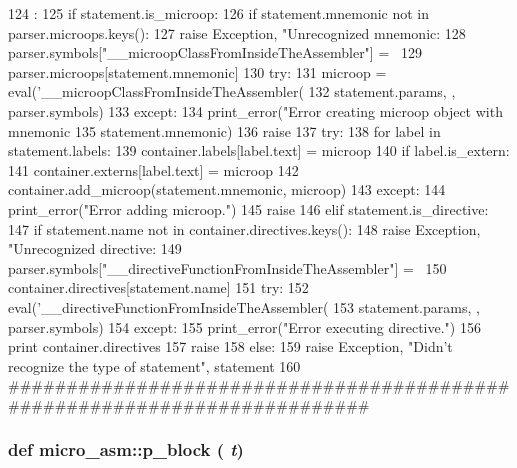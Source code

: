 \begin{DoxyCode}
124                                                   :
125     if statement.is_microop:
126         if statement.mnemonic not in parser.microops.keys():
127             raise Exception, "Unrecognized mnemonic: %
128         parser.symbols["__microopClassFromInsideTheAssembler"] = \
129             parser.microops[statement.mnemonic]
130         try:
131             microop = eval('__microopClassFromInsideTheAssembler(%
132                     statement.params, {}, parser.symbols)
133         except:
134             print_error("Error creating microop object with mnemonic %
135                     statement.mnemonic)
136             raise
137         try:
138             for label in statement.labels:
139                 container.labels[label.text] = microop
140                 if label.is_extern:
141                     container.externs[label.text] = microop
142             container.add_microop(statement.mnemonic, microop)
143         except:
144             print_error("Error adding microop.")
145             raise
146     elif statement.is_directive:
147         if statement.name not in container.directives.keys():
148             raise Exception, "Unrecognized directive: %
149         parser.symbols["__directiveFunctionFromInsideTheAssembler"] = \
150             container.directives[statement.name]
151         try:
152             eval('__directiveFunctionFromInsideTheAssembler(%
153                     statement.params, {}, parser.symbols)
154         except:
155             print_error("Error executing directive.")
156             print container.directives
157             raise
158     else:
159         raise Exception, "Didn't recognize the type of statement", statement
160 
##########################################################################
\end{DoxyCode}
\hypertarget{namespacemicro__asm_a02f1dabdaa8180367d76047e8d85ecfb}{
\index{p\_\-block@{p\_\-block}!micro_asm@{micro\_\-asm}}
\subsubsection[{p\_\-block}]{\setlength{\rightskip}{0pt plus 5cm}def micro\_\-asm::p\_\-block ( {\em t})}}
\label{namespacemicro__asm_a02f1dabdaa8180367d76047e8d85ecfb}



